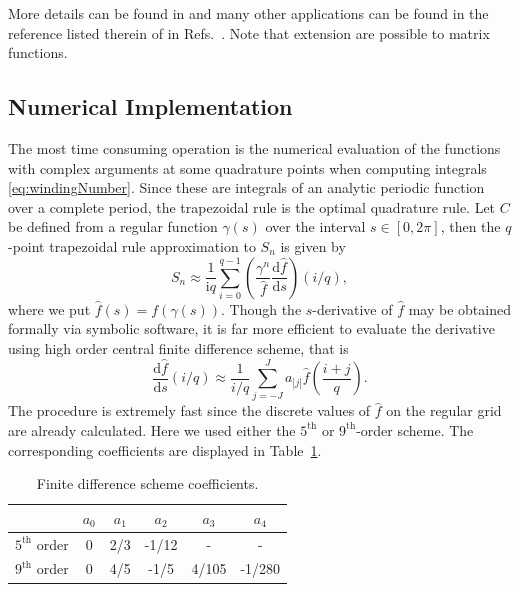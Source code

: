 \documentclass[a4paper,10pt]{article}
\newcommand{\ud}{\mathrm{d}}
\renewcommand{\i}{\mathrm{i}}
\begin{document}
More details can be found in \cite{Kravanja:2000} and many other applications can be found in the reference listed therein of in Refs.~\cite{Chen:2000,Nennig:2010}. Note that extension are possible to matrix functions\cite{Guttel:2017,SLEPc}.


\subsection{Numerical Implementation}


The most time consuming operation is the numerical evaluation of the functions with complex arguments at some quadrature
points when  computing integrals \eqref{eq:windingNumber}.
Since these are integrals of an analytic periodic function over a complete period, the trapezoidal rule is the optimal quadrature rule\cite[25.4.3]{Abramowitz:1965}. Let $C$ be defined from a regular function $\gamma(s)$ over the interval $s \in [0,2\pi]$, then the $q$-point trapezoidal rule approximation to $S_n$ is given by
\begin{equation}
S_n \approx \frac{1}{\i q} \sum_{i=0}^{q-1} \left ( \frac{\gamma^n}{\hat{f}}
\frac{\ud \hat{f}}{\ud s} \right ) (i/q),
\end{equation}
where we put $\hat{f}(s)=f(\gamma(s))$. Though the $s$-derivative of $\hat{f}$ may
be obtained formally via symbolic software, it is far more efficient to evaluate
the derivative using high order central finite difference scheme, that is
\begin{equation}
\frac{\ud \hat{f}}{\ud s} (i/q) \approx \frac{1}{i/q} \sum_{j=-J}^{J} a_{|j|} \hat{f} \left(\frac{i+j}{q}\right).
\end{equation}
The procedure is extremely fast since the discrete values  of $\hat{f}$ on the regular grid
are already calculated.
 Here we used either the $5^{\mathrm{th}}$ or $9^{\mathrm{th}}$-order scheme.
 The corresponding coefficients are displayed  in Table~\ref{tab:FiniteDifferenceSchemeCoefficients}.
 \begin{table}[htbp]
    \centering
    \caption{Finite difference scheme coefficients.}
        \begin{tabular}{lccccc}
        \hline
\hline
                              & $a_0$  &    $a_1$    &    $a_2$    & $a_3$    & $a_4$   \\
        \hline
\rule{0pt}{3ex}$5^\mathrm{th}$ order &   0    &     2/3     &     -1/12   &    -     &   -      \\
        $9^\mathrm{th}$ order &   0    &     4/5     &    -1/5     &  4/105   &  -1/280 \\
\hline
\hline        
        \end{tabular}      
    \label{tab:FiniteDifferenceSchemeCoefficients}
\end{table}
\end{document}
